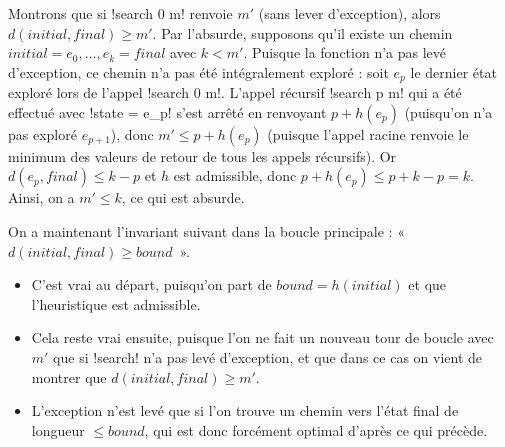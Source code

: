 \begin{ques}

    Montrons que si \ml!search 0 m! renvoie $m'$ (sans lever
    d'exception), alors $d(initial, final) \geq m'$.
    Par l'absurde, supposons qu'il existe un chemin
    $initial = e_{0}, \dots, e_{k} = final$ avec $k < m'$.
    Puisque la fonction n'a pas levé d'exception, ce chemin n'a
    pas été intégralement exploré : soit $e_{p}$ le dernier état
    exploré lors de l'appel \ml!search 0 m!. L'appel récursif
    \ml!search p m! qui a été effectué avec \ml!state = e_p!
    s'est arrêté en renvoyant $p + h(e_{p})$ (puisqu'on n'a
    pas exploré $e_{p + 1}$), donc $m' \leq p + h(e_{p})$
    (puisque l'appel racine renvoie le minimum des valeurs de
    retour de tous les appels récursifs).
    Or $d(e_{p}, final) \leq k - p$ et $h$ est admissible,
    donc $p + h(e_{p}) \leq p + k - p = k$. Ainsi, on a $m' \leq k$,
    ce qui est absurde.

    On a maintenant l'invariant suivant dans la boucle principale :
    «~$d(initial, final) \geq bound$~».
  \begin{itemize}
    \item C'est vrai au départ, puisqu'on part de $bound = h(initial)$ et
          que l'heuristique est admissible.
    \item Cela reste vrai ensuite, puisque l'on ne fait un nouveau tour de
          boucle avec $m'$ que si \ml!search! n'a pas levé d'exception,
          et que dans ce cas on vient de montrer que $d(initial, final) \geq m'$.
    \item L'exception n'est levé que si l'on trouve un chemin vers
          l'état final de longueur $\leq bound$, qui est donc forcément
          optimal d'après ce qui précède.
  \end{itemize}
\end{ques}


